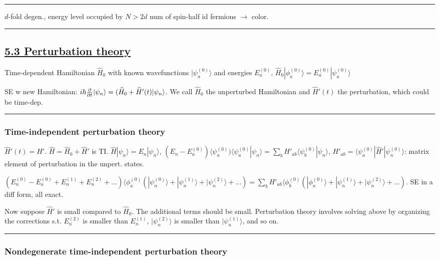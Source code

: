 \hrule height 0.07pt

$d$-fold degen., energy level occupied by $N > 2d$ num of spin-half id fermions $\rightarrow$ color.

\hrule height 0.07pt

\subsection{\underline{5.3 Perturbation theory}}

Time-dependent Hamiltonian $\widehat{H}_0$ with known wavefunctions $|\psi_a^{(0)}\rangle$ and energies $E_a^{(0)}$, $\widehat{H}_0 |\phi_a^{(0)} \rangle = E_a^{(0)} | \psi_a^{(0)} \rangle$

SE w new Hamiltonian: $i \hbar \pdv{}{t} | \psi_n \rangle = (\widehat{H}_0 + \widehat{H}'(t) | \psi_n \rangle$. We call $\widehat{H}_0$ the unperturbed Hamiltonian and $\widehat{H}'(t)$ the perturbation, which could be time-dep.

\hrule height 0.07pt

\subsubsection{Time-independent perturbation theory}

$\widehat{H}'(t) = \widehat{H}'$. $\widehat{H} = \widehat{H}_0 + \widehat{H}'$ is TI. $\widehat{H} |\psi_n \rangle = E_n | \psi_n \rangle$, $(E_n - E_a^{(0)}) \langle \psi_a^{(0)}) \langle \psi_a^{(0)} | \psi_n \rangle = \sum_b H'_{ab} \langle \psi_b^{(0)} | \psi_n \rangle$, $H'_{ab} = \langle \psi_a^{(0)} | \widehat{H}' | \psi_n^{(0)} \rangle$: matrix element of perturbation in the unpert. states.

$(E_n^{(0)} - E_a^{(0)} + E_n^{(1)} + E_n^{(2)} + \dots) \langle \phi_a^{(0)} (|\psi_n^{(0)} \rangle + | \psi_n^{(1)}\rangle + | \psi_n^{(2)} \rangle + \dots) = \sum_b H'_{ab} \langle \phi_b^{(0)} (| \phi_n^{(0)} \rangle + | \psi_n^{(1)} \rangle + |\psi_n^{(2)} \rangle + \dots)$. SE in a diff form, all exact.

Now suppose $\widehat{H}'$ is small compared to $\widehat{H}_0$. The additional terms should be small. Perturbation theory involves solving above by organizing the corrections s.t. $E_n^{(2)}$ is smaller than $E_n^{(1)}$, $|\psi_n^{(2)} \rangle$  is smaller than $|\psi_n^{(1)}\rangle$, and so on.

\hrule height 0.07pt

\subsubsection{Nondegenerate time-independent perturbation theory}

